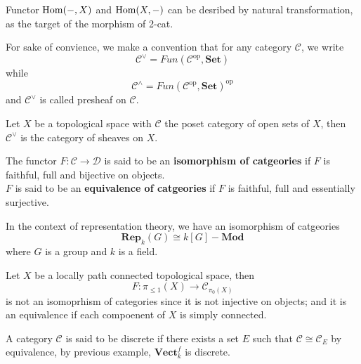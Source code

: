 \begin{example}
    Functor \(\operatorname{Hom}(-,X)\) and \(\operatorname{Hom}(X,-)\) can be desribed by natural transformation, as the target of the morphism of 2-cat.
\end{example}

\begin{remark}
    For sake of convience, we make a convention that for any category \(\mathcal{C}\), we write
    \[\mathcal{C}^\vee = Fun(\mathcal{C}^{\text{op}}, \mathbf{Set})\]
    while
    \[\mathcal{C}^{\wedge} = Fun(\mathcal{C}^{\text{op}}, \mathbf{Set})^{\text{op}}\]
    and \(\mathcal{C}^\vee\) is called presheaf on \(\mathcal{C}\). 
\end{remark}

\begin{example}
    Let \(X\) be a topological space with \(\mathcal{C}\) the poset category of open sets of \(X\), then \(\mathcal{C}^\vee\) is the category of sheaves on \(X\).
\end{example}

\begin{colordefinition}
    The functor \(F: \mathcal{C} \to \mathcal{D}\) is said to be an \textbf{isomorphism of catgeories} if \(F\) is faithful, full and bijective on objects.\\

    \(F\) is said to be an \textbf{equivalence of catgeories} if \(F\) is faithful, full and essentially surjective.\\
 \end{colordefinition}

 \begin{example}
    In the context of representation theory, we have an isomorphism of catgeories
    \[\mathbf{Rep}_k(G) \cong k[G]-\mathbf{Mod}\]
    where \(G\) is a group and \(k\) is a field.
 \end{example}

 \begin{example}
    Let \(X\) be a locally path connected topological space, then 
    \[F: \pi_{\leq 1}(X) \to \mathcal{C}_{\pi_0(X)}\]
    is not an isomoprhism of categories since it is not injective on objects; and it is an equivalence if each compoenent of \(X\) is simply connected.
 \end{example}

 \begin{example}
    A category \(\mathcal{C}\) is said to be discrete if there exists a set \(E\) such that \(\mathcal{C} \cong \mathcal{C}_{E}\) by equivalence, by previous example, \(\mathbf{Vect}_k^f\) is discrete.
 \end{example}

